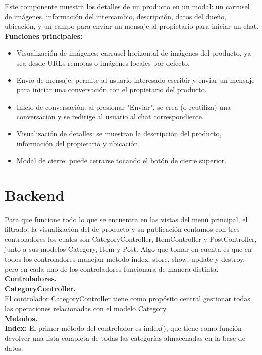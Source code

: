 \documentclass[11pt, a4paper, oneside]{book}
\begin{document}
Este componente muestra los detalles de un producto en un modal: un carrusel de imágenes, información del intercambio, descripción, datos del dueño, ubicación, y un campo para enviar un mensaje al propietario para iniciar un chat.\\

\textbf {Funciones principales:}

\begin{itemize}
\item Visualización de imágenes: carrusel horizontal de imágenes del producto, ya sea desde URLs remotas o imágenes locales por defecto.
\item Envío de mensaje: permite al usuario interesado escribir y enviar un mensaje para iniciar una conversación con el propietario del producto.
\item Inicio de conversación: al presionar "Enviar", se crea (o reutiliza) una conversación y se redirige al usuario al chat correspondiente.
\item Visualización de detalles: se muestran la descripción del producto, información del propietario y ubicación.
\item Modal de cierre: puede cerrarse tocando el botón de cierre superior.
\end{itemize}

\section{\textbf {Backend}}
Para que funcione todo lo que se encuentra en las vistas del menú principal, el filtrado, la visualización del de producto y su publicación contamos con tres controladores los cuales son CategoryController, ItemController y PostController, junto a sus modelos Category, Item y Post. Algo que tomar en cuenta es que en todos los controladores manejan método index, store, show, update y destroy, pero en cada uno de los controladores funcionara de manera distinta.\\

\textbf {Controladores.}\\

\textbf {CategoryController.}\\
El controlador CategoryController tiene como propósito central gestionar todas las operaciones relacionadas con el modelo Category.\\

\textbf {Metodos.}\\

\textbf {Index:} El primer método del controlador es index(), que tiene como función devolver una lista completa de todas las categorías almacenadas en la base de datos. \\
\end{document}
